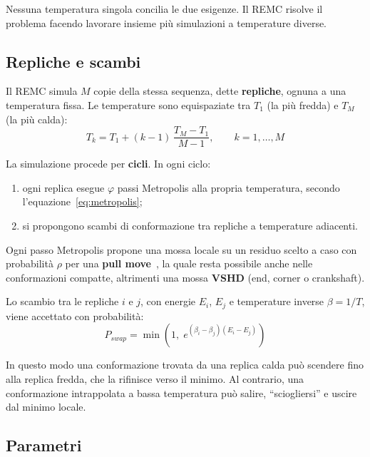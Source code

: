\documentclass[11pt,a4paper]{article}
\begin{document}
Nessuna temperatura singola concilia le due esigenze. Il REMC risolve il problema facendo lavorare insieme più simulazioni a temperature diverse.

\subsection{Repliche e scambi}
\label{sec:repliche}

Il REMC simula $M$ copie della stessa sequenza, dette \textbf{repliche}, ognuna a una temperatura fissa. Le temperature sono equispaziate tra $T_1$ (la più fredda) e $T_M$ (la più calda):
\begin{equation}
  T_k = T_1 + (k - 1)\,\frac{T_M - T_1}{M - 1}, \qquad k = 1, \dots, M
  \label{eq:temperature}
\end{equation}

La simulazione procede per \textbf{cicli}. In ogni ciclo:
\begin{enumerate}
  \item ogni replica esegue $\varphi$ passi Metropolis alla propria temperatura, secondo l'equazione~\eqref{eq:metropolis};
  \item si propongono scambi di conformazione tra repliche a temperature adiacenti.
\end{enumerate}

Ogni passo Metropolis propone una mossa locale su un residuo scelto a caso con probabilità $\rho$ per una \textbf{pull move}~\cite{lesh2003}, la quale resta possibile anche nelle conformazioni compatte, altrimenti una mossa \textbf{VSHD} (end, corner o crankshaft).

Lo scambio tra le repliche $i$ e $j$, con energie $E_i$, $E_j$ e temperature inverse $\beta = 1/T$, viene accettato con probabilità:
\begin{equation}
  P_{swap} = \min\left(1,\; e^{(\beta_i - \beta_j)(E_i - E_j)}\right)
  \label{eq:swap}
\end{equation}

In questo modo una conformazione trovata da una replica calda può scendere fino alla replica fredda, che la rifinisce verso il minimo. Al contrario, una conformazione intrappolata a bassa temperatura può salire, ``sciogliersi'' e uscire dal minimo locale.

\subsection{Parametri}
\label{sec:parametri}
\end{document}
